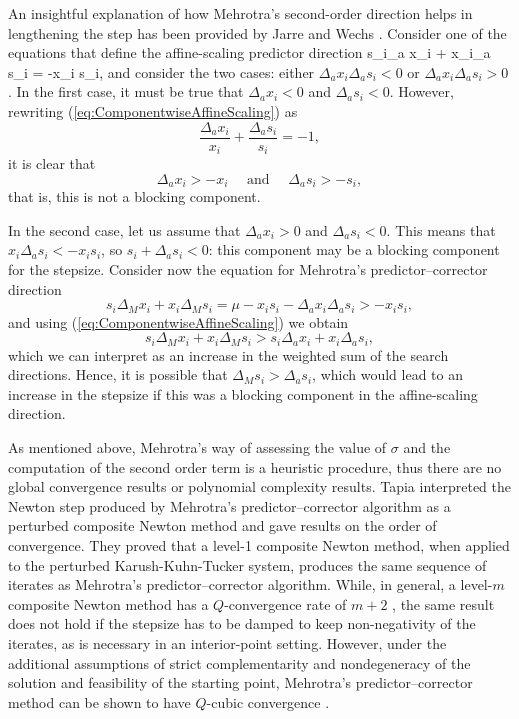 
An insightful explanation of how Mehrotra's second-order direction
helps in lengthening the step has been provided by
Jarre and Wechs \cite{JarreWechs}.
Consider one of the equations that define the affine-scaling
predictor direction
\be  \label{eq:ComponentwiseAffineScaling}
  s_i\Delta_a x_i + x_i\Delta_a s_i = -x_i s_i,
\ee
and consider the two cases: either $\Delta_a x_i \Delta_a s_i < 0$
or $\Delta_a x_i \Delta_a s_i > 0$. In the first case, it must be true
that $\Delta_a x_i < 0$ and $\Delta_a s_i < 0$.
However, rewriting (\ref{eq:ComponentwiseAffineScaling}) as
\[
  \frac{\Delta_a x_i}{x_i} + \frac{\Delta_a s_i}{s_i} = -1,
\]
it is clear that 
\[
  \Delta_a x_i > -x_i \quad \text{ and } \quad \Delta_a s_i > -s_i,
\]
that is, this is not a blocking component.

In the second case, let us assume that 
$\Delta_a x_i > 0$ and $\Delta_a s_i < 0$. 
This means that $x_i\Delta_a s_i < -x_is_i$, so $s_i + \Delta_a s_i < 0$:
this component may be a blocking component for the stepsize.
Consider now the equation for Mehrotra's predictor--corrector
direction
\[
  s_i\Delta_M x_i + x_i\Delta_M s_i = \mu -x_i s_i -\Delta_a x_i\Delta_a s_i 
                                    > -x_i s_i,
\]
and using (\ref{eq:ComponentwiseAffineScaling}) we obtain
\[
  s_i\Delta_M x_i + x_i\Delta_M s_i > s_i\Delta_a x_i + x_i\Delta_a s_i,
\]
which we can interpret as an increase in the weighted sum 
of the search directions. Hence, it is possible that 
$\Delta_M s_i > \Delta_a s_i$, which would lead to an increase in
the stepsize if this was a blocking component in the 
affine-scaling direction.

As mentioned above, Mehrotra's way of assessing the value of $\sigma$
and the computation of the second order term is a heuristic procedure,
thus there are 
no global convergence results or polynomial complexity results. 
Tapia \etal \cite{TapiaZhangSaltzmanWeiser} interpreted the Newton step 
produced by Mehrotra's predictor--corrector algorithm as a perturbed
composite Newton method and gave results on the order of convergence. 
They proved that a level-1 composite Newton method, when applied 
to the perturbed Karush-Kuhn-Tucker system, produces the same 
sequence of iterates as Mehrotra's predictor--corrector algorithm. 
While, in general, a level-$m$ composite Newton method has 
a $Q$-convergence rate of $m+2$ \cite{OrtegaRheinboldt},
the same result does not hold 
if the stepsize has to be damped to keep non-negativity of the iterates, 
as is necessary in an interior-point setting. However, under 
the additional assumptions of strict complementarity and nondegeneracy 
of the solution and feasibility of the starting point, Mehrotra's 
predictor--corrector method can be shown to have $Q$-cubic convergence
\cite{TapiaZhangSaltzmanWeiser}.


